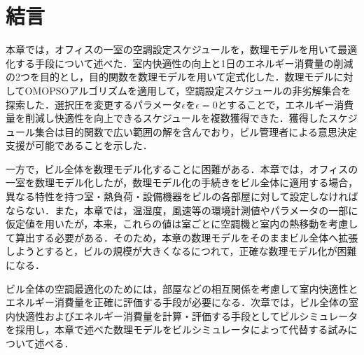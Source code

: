 \section{結言}
本章では，オフィスの一室の空調設定スケジュールを，数理モデルを用いて最適化する手段について述べた．室内快適性の向上と1日のエネルギー消費量の削減の2つを目的とし，目的関数を数理モデルを用いて定式化した．数理モデルに対してOMOPSOアルゴリズムを適用して，空調設定スケジュールの非劣解集合を探索した．選択圧を変更するパラメータ$\epsilon$を$\epsilon=0$とすることで，エネルギー消費量を削減し快適性を向上できるスケジュールを複数獲得できた．獲得したスケジュール集合は目的関数で広い範囲の解を含んでおり，ビル管理者による意思決定支援が可能であることを示した．

一方で，ビル全体を数理モデル化することに困難がある．本章では，オフィスの一室を数理モデル化したが，数理モデル化の手続きをビル全体に適用する場合，異なる特性を持つ室・熱負荷・設備機器をビルの各部屋に対して設定しなければならない．また，本章では，温湿度，風速等の環境計測値やパラメータの一部に仮定値を用いたが，本来，これらの値は室ごとに空調機と室内の熱移動を考慮して算出する必要がある．そのため，本章の数理モデルをそのままビル全体へ拡張しようとすると，ビルの規模が大きくなるにつれて，正確な数理モデル化が困難になる．

ビル全体の空調最適化のためには，部屋などの相互関係を考慮して室内快適性とエネルギー消費量を正確に評価する手段が必要になる．次章では，ビル全体の室内快適性およびエネルギー消費量を計算・評価する手段としてビルシミュレータを採用し，本章で述べた数理モデルをビルシミュレータによって代替する試みについて述べる．


